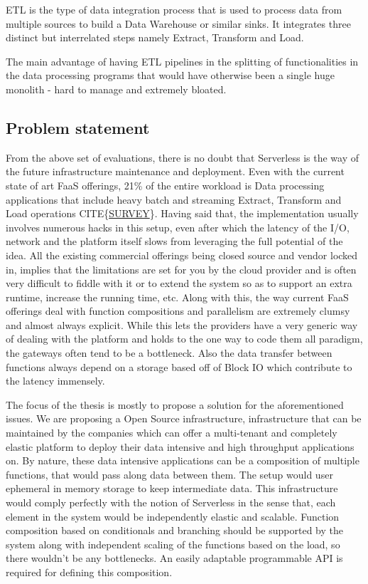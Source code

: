 \documentclass[12pt,titlepage]{article}
\begin{document}
ETL is the type of data integration process that is used to process data from
multiple sources to build a Data Warehouse or similar sinks. It integrates three
distinct but interrelated steps namely Extract, Transform and Load.

The main advantage of having ETL pipelines in the splitting of functionalities
in the data processing programs that would have otherwise been a single huge
monolith - hard to manage and extremely bloated. 
\subsection{Problem statement}
\label{sec:orgb43b216}
From the above set of evaluations, there is no doubt that Serverless is the way
of the future infrastructure maintenance and deployment. Even with the current
state of art FaaS offerings, 21\% of the entire workload is Data processing
applications that include heavy batch and streaming Extract, Transform and Load
operations CITE\{\href{https://www.serverless.com/blog/2018-serverless-community-survey-huge-growth-usage/}{SURVEY}\}. Having said that, the implementation usually involves
numerous hacks in this setup, even after which the latency of the I/O, network
and the platform itself slows from leveraging the full potential of the idea.
All the existing commercial offerings being closed source and vendor locked in,  
implies that the limitations are set for you by
the cloud provider and is often very difficult to fiddle with it or to extend
the system so as to support an extra runtime, increase the running time, etc.
Along with this, the way current FaaS offerings deal with function compositions
and parallelism are extremely clumsy and almost always explicit. While this lets
the providers have a very generic way of dealing with the platform and holds to
the one way to code them all paradigm, the gateways often tend to be a
bottleneck. Also the data transfer between functions always depend on a storage
based off of Block IO which contribute to the latency immensely.

The focus of the thesis is mostly to propose a solution for the aforementioned
issues. We are proposing a Open Source infrastructure, infrastructure that can
be maintained by the companies which can offer a multi-tenant and completely elastic
platform to deploy their data intensive and high throughput applications on.
By nature, these data intensive applications can be a composition of multiple
functions, that would pass along data between them. The setup would user
ephemeral in memory storage to keep intermediate data. This infrastructure
would comply perfectly with the notion of Serverless in the sense that, each
element in the system would be independently elastic and scalable. Function
composition based on conditionals and branching should be supported by the
system along with independent scaling of the functions based on the load, so
there wouldn't be any bottlenecks. An easily adaptable programmable API is
required for defining this composition.
\end{document}
